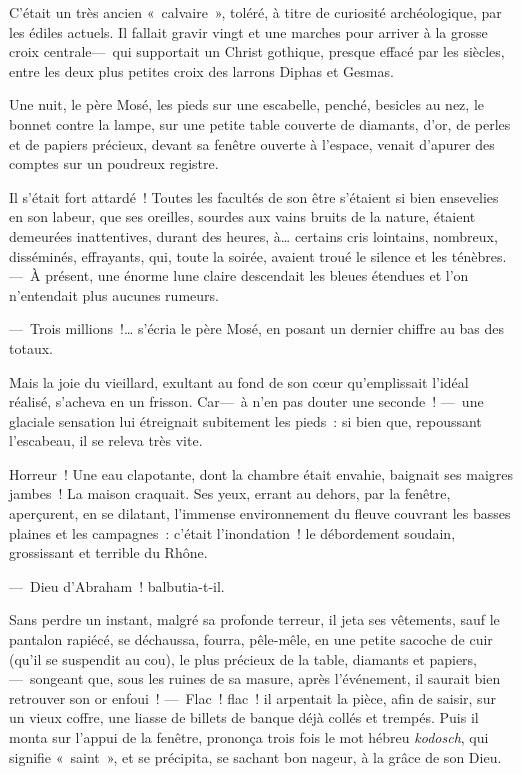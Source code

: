 \documentclass[french,twoside]{book} %
\begin{document}
C’était un très ancien « calvaire », toléré, à titre de curiosité archéologique, par les édiles actuels. Il fallait gravir vingt et une marches pour arriver à la grosse croix centrale— qui supportait un Christ gothique, presque effacé par les siècles, entre les deux plus petites croix des larrons Diphas et Gesmas.\par
Une nuit, le père Mosé, les pieds sur une escabelle,   penché, besicles au nez, le bonnet contre la lampe, sur une petite table couverte de diamants, d’or, de perles et de papiers précieux, devant sa fenêtre ouverte à l’espace, venait d’apurer des comptes sur un poudreux registre.\par
Il s’était fort attardé ! Toutes les facultés de son être s’étaient si bien ensevelies en son labeur, que ses oreilles, sourdes aux vains bruits de la nature, étaient demeurées inattentives, durant des heures, à… certains cris lointains, nombreux, disséminés, effrayants, qui, toute la soirée, avaient troué le silence et les ténèbres. — À présent, une énorme lune claire descendait les bleues étendues et l’on n’entendait plus aucunes rumeurs.\par
— Trois millions !… s’écria le père Mosé, en posant un dernier chiffre au bas des totaux.\par
Mais la joie du vieillard, exultant au fond de son cœur qu’emplissait l’idéal réalisé, s’acheva en un frisson. Car— à n’en pas douter une seconde ! — une glaciale sensation lui étreignait subitement les pieds : si bien que, repoussant l’escabeau, il se releva très vite.\par
   Horreur ! Une eau clapotante, dont la chambre était envahie, baignait ses maigres jambes ! La maison craquait. Ses yeux, errant au dehors, par la fenêtre, aperçurent, en se dilatant, l’immense environnement du fleuve couvrant les basses plaines et les campagnes : c’était l’inondation ! le débordement soudain, grossissant et terrible du Rhône.\par
— Dieu d’Abraham ! balbutia-t-il.\par
Sans perdre un instant, malgré sa profonde terreur, il jeta ses vêtements, sauf le pantalon rapiécé, se déchaussa, fourra, pêle-mêle, en une petite sacoche de cuir (qu’il se suspendit au cou), le plus précieux de la table, diamants et papiers, — songeant que, sous les ruines de sa masure, après l’événement, il saurait bien retrouver son or enfoui ! — Flac ! flac ! il arpentait la pièce, afin de saisir, sur un vieux coffre, une liasse de billets de banque déjà collés et trempés. Puis il monta sur l’appui de la fenêtre, prononça trois fois le mot hébreu \emph{kodosch}, qui signifie « saint », et se précipita, se sachant bon nageur, à la grâce de son Dieu.\par
\end{document}

